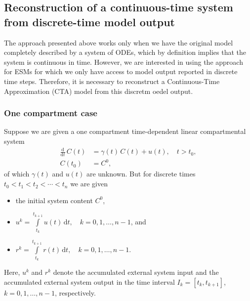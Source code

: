 \documentclass[11pt,a4paper]{article}
\newcommand{\deriv}[1]{\frac{\mathrm{d}}{\mathrm{d}#1}}
\newcommand{\dd}[1]{\,\mathrm{d}#1}
\newcommand{\intl}{\int\limits}
\begin{document}
\subsection{Reconstruction of a continuous-time system from discrete-time model output}
The approach presented above works only when we have the original model completely described by a system of ODEs, which by definition implies that the system is continuous in time. However, we are interested in using the approach for ESMs for which we only have access to model output reported in discrete time steps. Therefore, it is necessary to reconstruct a Continuous-Time Approximation (CTA) model from this discretm oedel output. 
    
    \subsubsection*{One compartment case}
        Suppose we are given a one compartment time-dependent linear compartmental system
        \begin{equation}\label{eqn:CS_one_dim}
            \begin{aligned}
                \deriv{t}\,C(t) &= \gamma(t)\,C(t) + u(t),\quad t>t_0,\\
                C(t_0) &= C^0,
            \end{aligned}
        \end{equation}
        of which $\gamma(t)$ and $u(t)$ are unknown.
        But for discrete times $t_0<t_1<t_2<\cdots<t_n$ we are given
        \begin{itemize}
            \item the initial system content $C^0$,
            \item $u^k = \intl_{t_k}^{t_{k+1}} u(t)\dd{t},\quad k=0,1,\ldots,n-1$, and
            \item $r^k = \intl_{t_k}^{t_{k+1}} r(t)\dd{t},\quad k=0,1,\ldots,n-1$.
        \end{itemize}
        Here, $u^k$ and $r^k$ denote the accumulated external system input and the accumulated external system output in the time interval $I_k=[t_k,t_{k+1}]$, $k=0,1,\ldots,n-1$, respectively.
\end{document}
